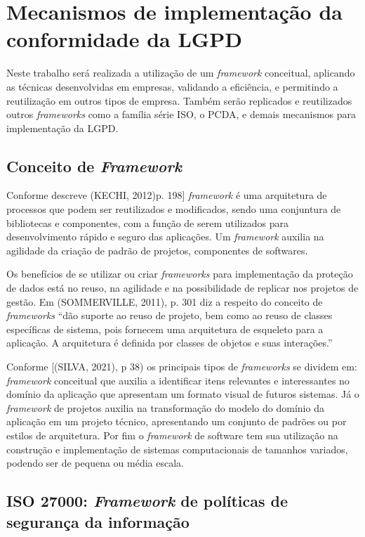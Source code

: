 \documentclass[
	12pt,				%
	openright,			%
	oneside,			%
	a4paper,			%
	english,			%
	french,				%
	spanish,			%
	brazil,				%
	]{abntex2}
\begin{document}
\section{Mecanismos de implementação da conformidade da LGPD}

Neste trabalho será realizada a utilização de um \textit{framework} conceitual, aplicando as técnicas desenvolvidas em empresas, validando a eficiência, e permitindo a reutilização em outros tipos de empresa. Também serão replicados e reutilizados outros \textit{frameworks} como a família série ISO, o PCDA, e demais mecanismos para implementação da LGPD. 

\subsection{Conceito de \textit{Framework}}

Conforme descreve (KECHI, 2012)p. 198] \textit{framework} é uma arquitetura de processos que podem ser reutilizados e modificados, sendo uma conjuntura de bibliotecas e componentes, com a função de serem utilizados para desenvolvimento rápido e seguro das aplicações. Um \textit{framework} auxilia na agilidade da criação de padrão de projetos, componentes de softwares.

Os benefícios de se utilizar ou criar \textit{frameworks} para implementação da proteção de dados está no reuso, na agilidade e na possibilidade de replicar nos projetos de gestão. Em (SOMMERVILLE, 2011), p. 301 diz a respeito do conceito de \textit{frameworks} “dão suporte ao reuso de projeto, bem como ao reuso de classes específicas de sistema, pois fornecem uma arquitetura de esqueleto para a aplicação. A arquitetura é definida por classes de objetos e suas interações.” 

Conforme [(SILVA, 2021), p 38) os principais tipos de \textit{frameworks} se dividem em: \textit{framework} conceitual que auxilia a identificar itens relevantes e interessantes no domínio da aplicação que apresentam um formato visual de futuros sistemas. Já o \textit{framework} de projetos auxilia na transformação do modelo do domínio da aplicação em um projeto técnico, apresentando um conjunto de padrões ou por estilos de arquitetura. Por fim o \textit{framework} de software tem sua utilização na construção e implementação de sistemas computacionais de tamanhos variados, podendo ser de pequena ou média escala.

\subsection{ISO 27000: \textit{Framework} de políticas de segurança da informação}
\end{document}
